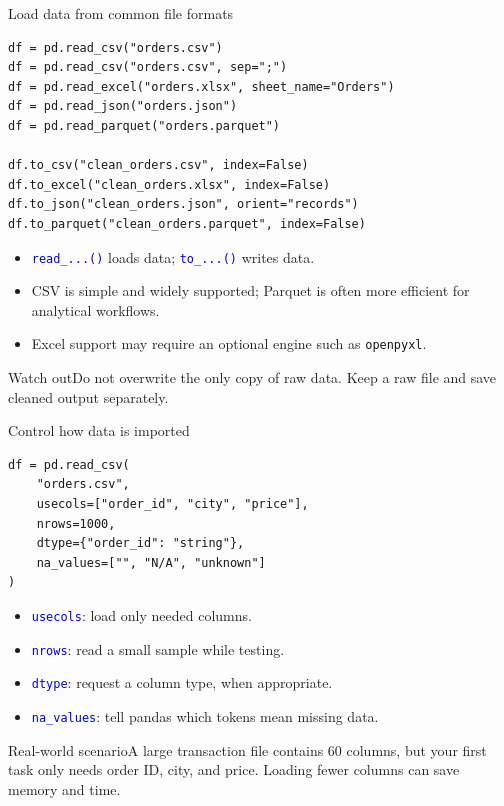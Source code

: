 \documentclass[aspectratio=169,10pt]{beamer}
\newcommand{\scenario}[1]{\begin{block}{Real-world scenario}#1\end{block}}
\newcommand{\pitfall}[1]{\begin{alertblock}{Watch out}#1\end{alertblock}}
\newcommand{\method}[1]{\texttt{\textcolor{Blue}{#1}}}
\begin{document}
\begin{frame}[fragile]{Load data from common file formats}
\begin{lstlisting}
df = pd.read_csv("orders.csv")
df = pd.read_csv("orders.csv", sep=";")
df = pd.read_excel("orders.xlsx", sheet_name="Orders")
df = pd.read_json("orders.json")
df = pd.read_parquet("orders.parquet")

df.to_csv("clean_orders.csv", index=False)
df.to_excel("clean_orders.xlsx", index=False)
df.to_json("clean_orders.json", orient="records")
df.to_parquet("clean_orders.parquet", index=False)
\end{lstlisting}
\begin{itemize}
\item \method{read\_...()} loads data; \method{to\_...()} writes data.
\item CSV is simple and widely supported; Parquet is often more efficient for analytical workflows.
\item Excel support may require an optional engine such as \texttt{openpyxl}.
\end{itemize}
\pitfall{Do not overwrite the only copy of raw data. Keep a raw file and save cleaned output separately.}
\end{frame}

\begin{frame}[fragile]{Control how data is imported}
\begin{lstlisting}
df = pd.read_csv(
    "orders.csv",
    usecols=["order_id", "city", "price"],
    nrows=1000,
    dtype={"order_id": "string"},
    na_values=["", "N/A", "unknown"]
)
\end{lstlisting}
\begin{itemize}
\item \method{usecols}: load only needed columns.
\item \method{nrows}: read a small sample while testing.
\item \method{dtype}: request a column type, when appropriate.
\item \method{na\_values}: tell pandas which tokens mean missing data.
\end{itemize}
\scenario{A large transaction file contains 60 columns, but your first task only needs order ID, city, and price. Loading fewer columns can save memory and time.}
\end{frame}
\end{document}
